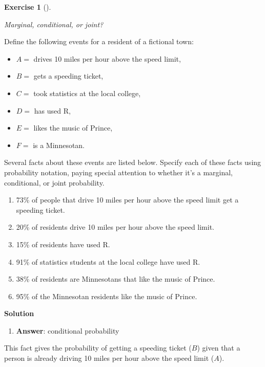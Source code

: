 \documentclass[
  letterpaper,
  DIV=11,
  numbers=noendperiod]{scrartcl}
\providecommand{\tightlist}{%
  \setlength{\itemsep}{0pt}\setlength{\parskip}{0pt}}
\theoremstyle{definition}
\newtheorem{exercise}{Exercise}[section]
\theoremstyle{remark}
\begin{document}
\begin{exercise}[]\protect\hypertarget{exr-2_66}{}\label{exr-2_66}

\emph{Marginal, conditional, or joint?}

Define the following events for a resident of a fictional town:

\begin{itemize}
\item
  \(A=\) drives 10 miles per hour above the speed limit,
\item
  \(B=\) gets a speeding ticket,
\item
  \(C=\) took statistics at the local college,
\item
  \(D=\) has used R,
\item
  \(E=\) likes the music of Prince,
\item
  \(F=\) is a Minnesotan.
\end{itemize}

Several facts about these events are listed below. Specify each of these
facts using probability notation, paying special attention to whether
it's a marginal, conditional, or joint probability.

\begin{enumerate}
\def\labelenumi{\alph{enumi})}
\item
  73\% of people that drive 10 miles per hour above the speed limit get
  a speeding ticket.
\item
  20\% of residents drive 10 miles per hour above the speed limit.
\item
  15\% of residents have used R.
\item
  91\% of statistics students at the local college have used R.
\item
  38\% of residents are Minnesotans that like the music of Prince.
\item
  95\% of the Minnesotan residents like the music of Prince.
\end{enumerate}

\end{exercise}

\textbf{Solution}

\begin{enumerate}
\def\labelenumi{\alph{enumi})}
\tightlist
\item
  \textbf{Answer}: conditional probability
\end{enumerate}

This fact gives the probability of getting a speeding ticket (\(B\))
given that a person is already driving 10 miles per hour above the speed
limit (\(A\)).
\end{document}
